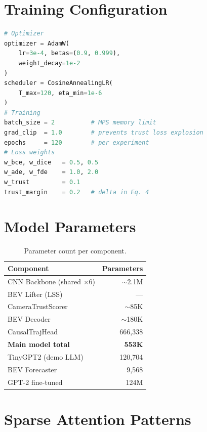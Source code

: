\documentclass[10pt,twocolumn]{article}
\begin{document}



\appendix

\section{Training Configuration}
\label{app:config}

\begin{lstlisting}[language=Python,caption=Training configuration.]
# Optimizer
optimizer = AdamW(
    lr=3e-4, betas=(0.9, 0.999),
    weight_decay=1e-2
)
scheduler = CosineAnnealingLR(
    T_max=120, eta_min=1e-6
)
# Training
batch_size = 2          # MPS memory limit
grad_clip  = 1.0        # prevents trust loss explosion
epochs     = 120        # per experiment
# Loss weights
w_bce, w_dice   = 0.5, 0.5
w_ade, w_fde    = 1.0, 2.0
w_trust         = 0.1
trust_margin    = 0.2   # delta in Eq. 4
\end{lstlisting}

\section{Model Parameters}
\label{app:params}

\begin{table}[h]
\centering
\caption{Parameter count per component.}
\scriptsize
\begin{tabular}{@{}lr@{}}
\toprule
\textbf{Component} & \textbf{Parameters} \\
\midrule
CNN Backbone (shared $\times$6) & $\sim$2.1M \\
BEV Lifter (LSS) & --- \\
CameraTrustScorer & $\sim$85K \\
BEV Decoder & $\sim$180K \\
CausalTrajHead & 666,338 \\
\midrule
\textbf{Main model total} & \textbf{553K} \\
\midrule
TinyGPT2 (demo LLM) & 120,704 \\
BEV Forecaster & 9,568 \\
GPT-2 fine-tuned & 124M \\
\bottomrule
\end{tabular}
\end{table}

\section{Sparse Attention Patterns}
\label{app:sparse}
\end{document}
